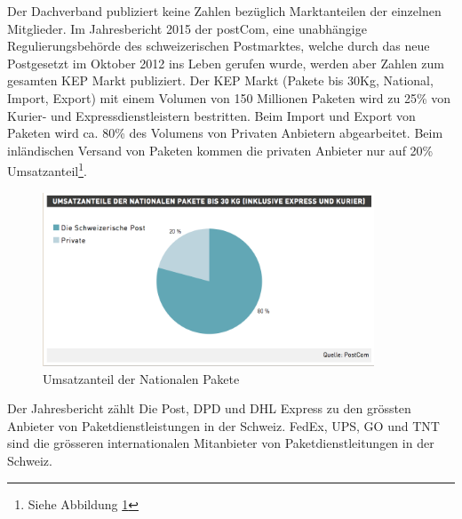 Der Dachverband publiziert keine Zahlen bezüglich Marktanteilen der einzelnen Mitglieder. Im Jahresbericht 2015\citep[S.32]{postCom.2015} der postCom, eine unabhängige Regulierungsbehörde des schweizerischen Postmarktes, welche durch das neue Postgesetzt im Oktober 2012 ins Leben gerufen wurde, werden aber Zahlen zum gesamten KEP Markt publiziert. Der KEP Markt (Pakete bis 30Kg, National, Import, Export) mit einem Volumen von 150 Millionen Paketen wird zu 25\% von Kurier- und Expressdienstleistern bestritten. Beim Import und Export von Paketen wird ca. 80\% des Volumens von Privaten Anbietern abgearbeitet. Beim inländischen Versand von Paketen kommen die privaten Anbieter nur auf 20\% Umsatzanteil\footnote{Siehe Abbildung \ref{fig1:umsatzanteil}}.
\begin{figure}[ht]
	\centering
  \includegraphics[width=0.88\textwidth]{images/umsatzanteilNational.png}
	\caption{Umsatzanteil der Nationalen Pakete} %
	\label{fig1:umsatzanteil}
\end{figure}
Der Jahresbericht zählt Die Post, DPD und DHL Express zu den grössten Anbieter von Paketdienstleistungen in der Schweiz. FedEx, UPS, GO und TNT sind die grösseren internationalen Mitanbieter von Paketdienstleitungen in der Schweiz.

